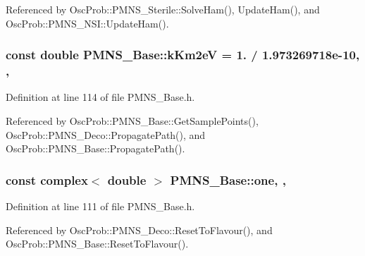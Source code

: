 Referenced by Osc\+Prob\+::\+P\+M\+N\+S\+\_\+\+Sterile\+::\+Solve\+Ham(), Update\+Ham(), and Osc\+Prob\+::\+P\+M\+N\+S\+\_\+\+N\+S\+I\+::\+Update\+Ham().

\subsubsection[{\texorpdfstring{k\+Km2eV}{kKm2eV}}]{\setlength{\rightskip}{0pt plus 5cm}const double P\+M\+N\+S\+\_\+\+Base\+::k\+Km2eV = 1. / 1.\+973269718e-\/10\hspace{0.3cm}{\ttfamily [static]}, {\ttfamily [protected]}, {\ttfamily [inherited]}}\hypertarget{classOscProb_1_1PMNS__Base_a382ddd7b76ca89b43f22614a2ea7327b}{}\label{classOscProb_1_1PMNS__Base_a382ddd7b76ca89b43f22614a2ea7327b}


Definition at line 114 of file P\+M\+N\+S\+\_\+\+Base.\+h.



Referenced by Osc\+Prob\+::\+P\+M\+N\+S\+\_\+\+Base\+::\+Get\+Sample\+Points(), Osc\+Prob\+::\+P\+M\+N\+S\+\_\+\+Deco\+::\+Propagate\+Path(), and Osc\+Prob\+::\+P\+M\+N\+S\+\_\+\+Base\+::\+Propagate\+Path().

\subsubsection[{\texorpdfstring{one}{one}}]{\setlength{\rightskip}{0pt plus 5cm}const {\bf complex}$<$ double $>$ P\+M\+N\+S\+\_\+\+Base\+::one\hspace{0.3cm}{\ttfamily [static]}, {\ttfamily [protected]}, {\ttfamily [inherited]}}\hypertarget{classOscProb_1_1PMNS__Base_ab64aab27448a5aca27565c991a9d173e}{}\label{classOscProb_1_1PMNS__Base_ab64aab27448a5aca27565c991a9d173e}


Definition at line 111 of file P\+M\+N\+S\+\_\+\+Base.\+h.



Referenced by Osc\+Prob\+::\+P\+M\+N\+S\+\_\+\+Deco\+::\+Reset\+To\+Flavour(), and Osc\+Prob\+::\+P\+M\+N\+S\+\_\+\+Base\+::\+Reset\+To\+Flavour().

